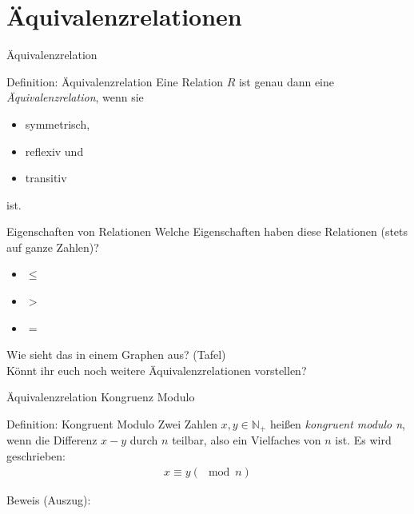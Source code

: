 \section{Äquivalenzrelationen}
\begin{frame}{Äquivalenzrelation}
    \begin{block}{Definition: Äquivalenzrelation}
        Eine Relation $R$ ist genau dann eine \emph{Äquivalenzrelation}, wenn sie
        \begin{itemize}
            \item symmetrisch,
            \item reflexiv und
            \item transitiv
        \end{itemize} ist.
    \end{block}
\end{frame}
\begin{frame}{Eigenschaften von Relationen}
    Welche Eigenschaften haben diese Relationen (stets auf ganze Zahlen)?
    \begin{itemize}
        \item $\leq$ 
        \item $>$ 
        \item $=$ 
    \end{itemize}
    Wie sieht das in einem Graphen aus? (Tafel)\\
    \pause
    Könnt ihr euch noch weitere Äquivalenzrelationen vorstellen? 
\end{frame}
\begin{frame}{Äquivalenzrelation Kongruenz Modulo}
    \begin{block}{Definition: Kongruent Modulo}
        Zwei Zahlen $x, y\in \mathbb{N}_+$ heißen \emph{kongruent modulo n}, wenn die Differenz $x-y$ durch $n$ teilbar, also ein Vielfaches von $n$ ist. Es wird geschrieben:
        \begin{align*}
            x \equiv y \left( \mod n \right)
        \end{align*}
    \end{block}
    Beweis (Auszug):
\end{frame}
